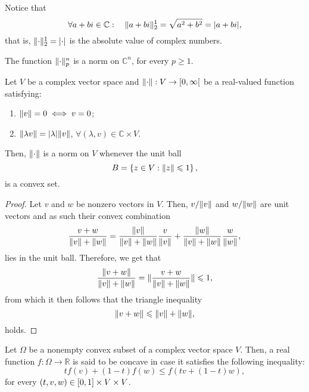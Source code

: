 Notice that
\[
  \forall{a+bi\in\mathbb{C}}:\quad{\lVert a+bi\rVert^{1}_{2}=\sqrt{a^{2}+b^{2}}=\lvert a+bi\rvert},
\]
that is, \(\lVert\cdot\rVert^{1}_{2}=\lvert\cdot\rvert\) is the absolute value of complex numbers.

\begin{proposition}\label{proposition:the-p-norm-is-in-fact-a-norm}
  The function \(\lVert\cdot\rVert^{n}_{p}\) is a norm on \(\mathbb{C}^{n}\), for every \(p\geqslant{1}\).
\end{proposition}

\begin{lemma}\label{lemma:on-norms-and-the-convexity-of-the-unitary-closed-ball}
  Let \(V\) be a complex vector space and
  \(\norm{\cdot}:V\to\rinterval{0}{\infty}\) be a real-valued function
  satisfying:
  \begin{enumerate}
    \item
      \(\lVert v\rVert=0\iff{v=0}\);
    \item
      \(\lVert\lambda{v}\rVert=\lvert\lambda\rvert\lVert v\rVert\), \(\forall(\lambda,v)\in\mathbb{C}\times{V}\).
  \end{enumerate}
  Then, \(\lVert\cdot\rVert\) is a norm on \(V\) whenever the unit ball
  \[
    B=\left\{z\in{V}:\lVert z\rVert\leqslant{1}\right\},
  \]
  is a convex set.
\end{lemma}

\begin{proof}
  Let \(v\) and \(w\) be nonzero vectors in \(V\). Then, \(v/\lVert v\rVert\) and
  \(w/\lVert w\rVert\) are unit vectors and as such their convex combination
  \[
    \frac{v+w}{\lVert v\rVert+\lVert w\rVert}
    =
    \frac{\lVert v\rVert}{\lVert v\rVert+\lVert w\rVert}\frac{v}{\lVert v\rVert}
    +
    \frac{\lVert w\rVert}{\lVert v\rVert+\lVert w\rVert}\frac{w}{\lVert w\rVert}
    ,
  \]
  lies in the unit ball. Therefore, we get that
  \[
    \frac{\lVert v+w\rVert}{\lVert v\rVert+\lVert w\rVert}
    =
    \lVert\frac{v+w}{\lVert v\rVert+\lVert w\rVert}\rVert\leqslant{1},
  \]
  from which it then follows that the triangle inequality
  \[
    \lVert v+w\rVert\leqslant{\lVert v\rVert+\lVert w\rVert},
  \]
  holds.
\end{proof}

\begin{definition}\label{def:concave-function}
  Let \(\Omega\) be a nonempty convex subset of a complex vector space \(V\).
  Then, a real function \(f:\Omega\to\mathbb{R}\) is said to be concave in case
  it satisfies the following inequality:
  \[
    tf(v)+(1-t)f(w)\leqslant{f(tv+(1-t)w)},
  \]
  for every \((t,v,w)\in{\interval{0}{1}\times{V}\times{V}}\).
\end{definition}

